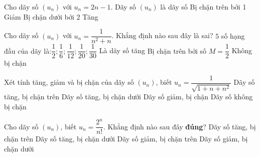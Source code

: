 \begin{ex}%
	 Cho dãy số $( u_n)$ với $u_n=2n-1$. Dãy số $( u_n)$ là dãy số
	 \choice
		{ Bị chặn  trên bởi 1}
		{  Giảm}
		{ Bị chặn dưới  bởi 2}
		{ \True Tăng} 
\end{ex}

\begin{ex}%
	Cho dãy số $( u_n)$ với $u_n=\dfrac{1}{{{n}^2}+n}$. Khẳng định nào sau đây là sai? 
	 \choice
		 { $5$ số hạng đầu của dãy là:$\dfrac{1}{2};\dfrac{1}{6};\dfrac{1}{12};\dfrac{1}{20};\dfrac{1}{30}$}
		{ \True Là  dãy số tăng}
		{ Bị chặn trên bởi số $M=\dfrac{1}{2}$} 
		{ Không bị  chặn}
\end{ex}

\begin{ex}%
	Xét tính  tăng, giảm và bị chặn của dãy số $(u_n)$, biết $u_n=\dfrac{1}{\sqrt{1+n+n^2}}$
	 \choice
		 {Dãy số tăng, bị chặn trên}
		{Dãy số tăng,  bị chặn dưới}
		{\True  Dãy số giảm, bị chặn}
		{Dãy số không  bị chặn }
\end{ex}

\begin{ex}%
	Cho dãy số $(u_n)$, biết $u_n=\dfrac{2^n}{n!}$. Khẳng định nào  sau đây \textbf{đúng}?
	\choice 
		{Dãy số tăng, bị  chặn trên}
		{Dãy  số tăng, bị chặn dưới}
		{ \True Dãy số giảm, bị chặn trên} 
		{Dãy số giảm, bị chặn dưới} 
\end{ex}

